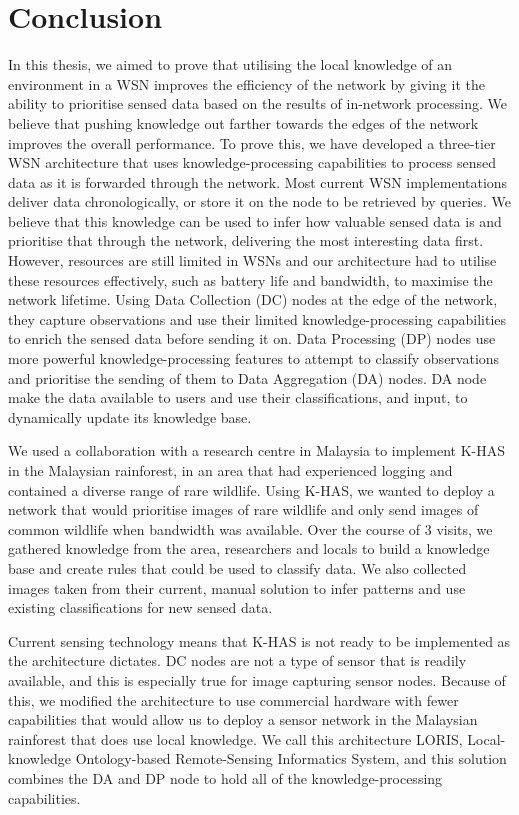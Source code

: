 
\chapter{Conclusion}
In this thesis, we aimed to prove that utilising the local knowledge of an environment in a WSN improves the efficiency of the network by giving it the ability to prioritise sensed data based on the results of in-network processing.  We believe that pushing knowledge out farther towards the edges of the network improves the overall performance. To prove this, we have developed a three-tier WSN architecture that uses knowledge-processing capabilities to process sensed data as it is forwarded through the network. Most current WSN implementations deliver data chronologically, or store it on the node to be retrieved by queries. We believe that this knowledge can be used to infer how valuable sensed data is and prioritise that through the network, delivering the most interesting data first. However, resources are still limited in WSNs and our architecture had to utilise these resources effectively, such as battery life and bandwidth, to maximise the network lifetime. Using Data Collection (DC) nodes at the edge of the network, they capture observations and use their limited knowledge-processing capabilities to enrich the sensed data before sending it on. Data Processing (DP) nodes use more powerful knowledge-processing features to attempt to classify observations and prioritise the sending of them to Data Aggregation (DA) nodes. DA node make the data available to users and use their classifications, and input, to dynamically update its knowledge base.

We used a collaboration with a research centre in Malaysia to implement K-HAS in the Malaysian rainforest, in an area that had experienced logging and contained a diverse range of rare wildlife. Using K-HAS, we wanted to deploy a network that would prioritise images of rare wildlife and only send images of common wildlife when bandwidth was available.  Over the course of 3 visits, we gathered knowledge from the area, researchers and locals to build a knowledge base and create rules that could be used to classify data. We also collected images taken from their current, manual solution to infer patterns and use existing classifications for new sensed data.

Current sensing technology means that K-HAS is not ready to be implemented as the architecture dictates. DC nodes are not a type of sensor that is readily available, and this is especially true for image capturing sensor nodes. Because of this, we modified the architecture to use commercial hardware with fewer capabilities that would allow us to deploy a sensor network in the Malaysian rainforest that does use local knowledge. We call this architecture LORIS, Local-knowledge Ontology-based Remote-Sensing Informatics System, and this solution combines the DA and DP node to hold all of the knowledge-processing capabilities.

